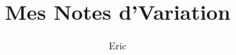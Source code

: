 \documentclass{article}
\begin{document}
\title{Mes Notes d'Variation}
\author{Eric}
\maketitle
\tableofcontents
\newpage












\end{document}
